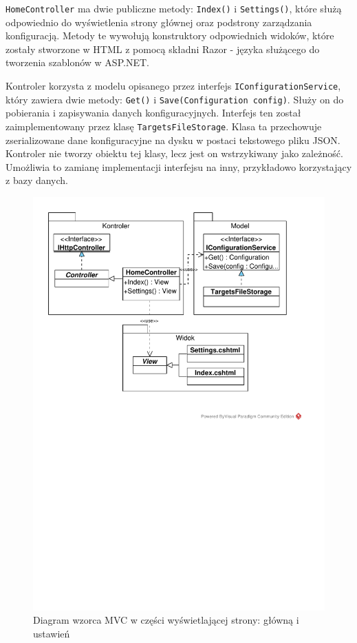 \texttt{HomeController} ma dwie publiczne metody: \texttt{Index()} i \texttt{Settings()}, które służą odpowiednio do wyświetlenia strony głównej oraz podstrony zarządzania konfiguracją. Metody te wywołują konstruktory odpowiednich widoków, które zostały stworzone w HTML z pomocą składni Razor - języka służącego do tworzenia szablonów w ASP.NET.

Kontroler korzysta z modelu opisanego przez interfejs \texttt{IConfigurationService}, który zawiera dwie metody: \texttt{Get()} i \texttt{Save(Configuration config)}. Służy on do pobierania i zapisywania danych konfiguracyjnych. Interfejs ten został zaimplementowany przez klasę \texttt{TargetsFileStorage}. Klasa ta przechowuje zserializowane dane konfiguracyjne na dysku w postaci tekstowego pliku JSON. Kontroler nie tworzy obiektu tej klasy, lecz jest on wstrzykiwany jako zależność. Umożliwia to zamianę implementacji interfejsu na inny, przykładowo korzystający z bazy danych.

\begin{figure}[htbp]
	\centering
	\includegraphics[clip, trim=1cm 15cm 2.5cm 1cm, width=1.00\textwidth]{uml/mvc.pdf}
	\caption{Diagram wzorca MVC w części wyświetlającej strony: główną i ustawień}
	\label{fig:mvc}
\end{figure}

